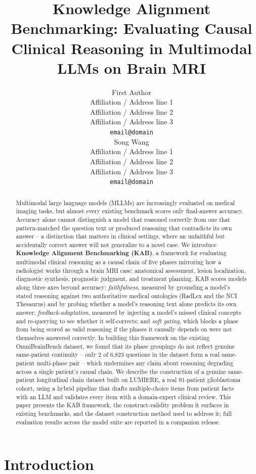\documentclass[11pt]{article}
\title{Knowledge Alignment Benchmarking: Evaluating Causal Clinical Reasoning in Multimodal LLMs on Brain MRI}
\author{First Author \\
  Affiliation / Address line 1 \\
  Affiliation / Address line 2 \\
  Affiliation / Address line 3 \\
  \texttt{email@domain} \\\And
  Song Wang \\
  Affiliation / Address line 1 \\
  Affiliation / Address line 2 \\
  Affiliation / Address line 3 \\
  \texttt{email@domain} \\}
\begin{document}
\maketitle
\begin{abstract}
Multimodal large language models (MLLMs) are increasingly evaluated on medical imaging tasks, but almost every existing benchmark scores only final-answer accuracy. Accuracy alone cannot distinguish a model that reasoned correctly from one that pattern-matched the question text or produced reasoning that contradicts its own answer -- a distinction that matters in clinical settings, where an unfaithful but accidentally correct answer will not generalize to a novel case. We introduce \textbf{Knowledge Alignment Benchmarking (KAB)}, a framework for evaluating multimodal clinical reasoning as a causal chain of five phases mirroring how a radiologist works through a brain MRI case: anatomical assessment, lesion localization, diagnostic synthesis, prognostic judgment, and treatment planning. KAB scores models along three axes beyond accuracy: \emph{faithfulness}, measured by grounding a model's stated reasoning against two authoritative medical ontologies (RadLex and the NCI Thesaurus) and by probing whether a model's reasoning text alone predicts its own answer; \emph{feedback-adaptation}, measured by injecting a model's missed clinical concepts and re-querying to see whether it self-corrects; and \emph{soft gating}, which blocks a phase from being scored as valid reasoning if the phases it causally depends on were not themselves answered correctly. In building this framework on the existing OmniBrainBench dataset, we found that its phase groupings do not reflect genuine same-patient continuity -- only 2 of 6,823 questions in the dataset form a real same-patient multi-phase pair -- which undermines any claim about reasoning degrading across a single patient's causal chain. We describe the construction of a genuine same-patient longitudinal chain dataset built on LUMIERE, a real 91-patient glioblastoma cohort, using a hybrid pipeline that drafts multiple-choice items from patient facts with an LLM and validates every item with a domain-expert clinical review. This paper presents the KAB framework, the construct-validity problem it surfaces in existing benchmarks, and the dataset construction method used to address it; full evaluation results across the model suite are reported in a companion release.
\end{abstract}

\section{Introduction}
\label{sec:introduction}
\end{document}
